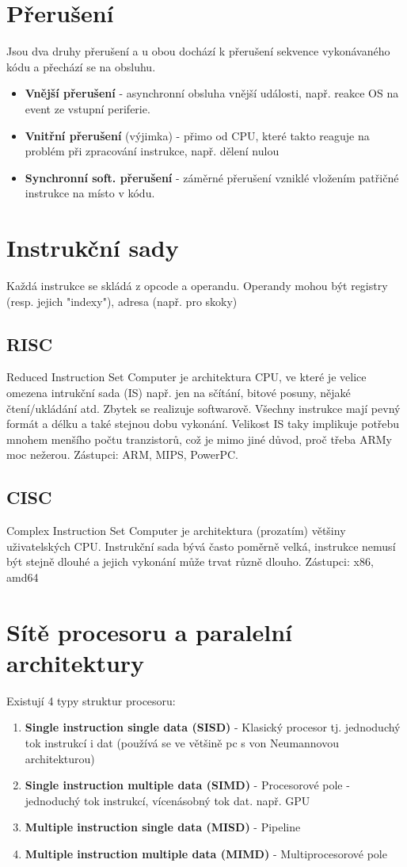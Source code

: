\documentclass[10pt,a4paper,openright]{article}
\begin{document}
\section{Přerušení}
Jsou dva druhy přerušení a u obou dochází k přerušení sekvence vykonávaného kódu a přechází se na obsluhu.
\begin{itemize}
\item \textbf{Vnější přerušení} - asynchronní obsluha vnější události, např. reakce OS na event ze vstupní periferie.
\item \textbf{Vnitřní přerušení} (výjimka) - přimo od CPU, které takto reaguje na problém při zpracování instrukce, např. dělení nulou
\item \textbf{Synchronní soft. přerušení} - záměrné přerušení vzniklé vložením patřičné instrukce na místo v kódu.
\end{itemize}


\section{Instrukční sady}
Každá instrukce se skládá z opcode a operandu. Operandy mohou být registry (resp. jejich "indexy"), adresa (např. pro skoky)

\subsection{RISC}
Reduced Instruction Set Computer je architektura CPU, ve které je velice omezena intrukční sada (IS) např. jen na sčítání, bitové posuny, nějaké čtení/ukládání atd. Zbytek se realizuje softwarově. Všechny instrukce mají pevný formát a délku a také stejnou dobu vykonání. Velikost IS taky implikuje potřebu mnohem menšího počtu tranzistorů, což je mimo jiné důvod, proč třeba ARMy moc nežerou. Zástupci: ARM, MIPS, PowerPC.

\subsection{CISC}
Complex Instruction Set Computer je architektura (prozatím) většiny uživatelských CPU. Instrukční sada bývá často poměrně velká, instrukce nemusí být stejně dlouhé a jejich vykonání může trvat různě dlouho. Zástupci: x86, amd64

\section{Sítě procesoru a paralelní architektury}
Existují 4 typy struktur procesoru:
\begin{enumerate}
\item \textbf{Single instruction single data (SISD)} - Klasický procesor tj. jednoduchý tok instrukcí i dat (používá se ve většině pc s von Neumannovou architekturou)
\item \textbf{Single instruction multiple data (SIMD)} - Procesorové pole - jednoduchý tok instrukcí, vícenásobný tok dat. např. GPU
\item \textbf{Multiple instruction single data (MISD)} - Pipeline
\item \textbf{Multiple instruction multiple data (MIMD)} - Multiprocesorové pole
\end{enumerate}
\end{document}
